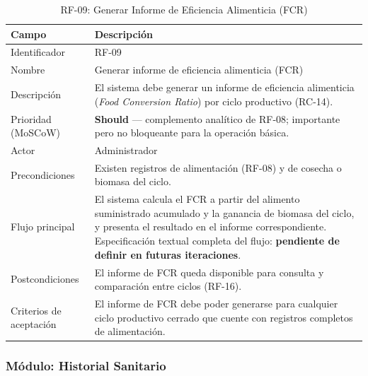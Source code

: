 \documentclass[12pt,a4paper]{article}
\begin{document}
\begin{table}[H]
\centering
\caption{RF-09: Generar Informe de Eficiencia Alimenticia (FCR)}
\begin{tabular}{|p{3.6cm}|p{10.4cm}|}
\hline
\textbf{Campo} & \textbf{Descripción} \\
\hline
Identificador & RF-09 \\ \hline
Nombre & Generar informe de eficiencia alimenticia (FCR) \\ \hline
Descripción & El sistema debe generar un informe de eficiencia alimenticia
(\textit{Food Conversion Ratio}) por ciclo productivo (RC-14). \\ \hline
Prioridad (MoSCoW) & \textbf{Should} --- complemento analítico de RF-08;
importante pero no bloqueante para la operación básica. \\ \hline
Actor & Administrador \\ \hline
Precondiciones & Existen registros de alimentación (RF-08) y de cosecha o
biomasa del ciclo. \\ \hline
Flujo principal & El sistema calcula el FCR a partir del alimento suministrado
acumulado y la ganancia de biomasa del ciclo, y presenta el resultado en el
informe correspondiente. Especificación textual completa del flujo:
\textbf{pendiente de definir en futuras iteraciones}. \\ \hline
Postcondiciones & El informe de FCR queda disponible para consulta y
comparación entre ciclos (RF-16). \\ \hline
Criterios de aceptación & El informe de FCR debe poder generarse para
cualquier ciclo productivo cerrado que cuente con registros completos de
alimentación. \\ \hline
\end{tabular}
\end{table}


\subsubsection{Módulo: Historial Sanitario}
\end{document}
